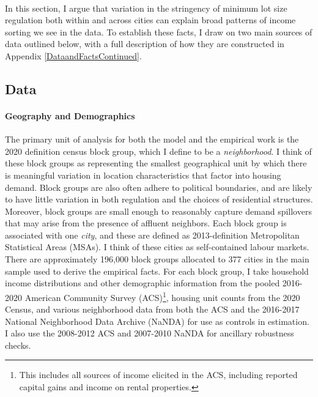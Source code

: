 \documentclass[12pt]{article}
\begin{document}
	\paragraph*{}
	In this section, I argue that variation in the stringency of minimum lot size regulation both within and across cities can explain broad patterns of income sorting we see in the data. To establish these facts, I draw on two main sources of data outlined below, with a full description of how they are constructed in Appendix \ref{DataandFactsContinued}.
	
	\subsection{Data}

	 \paragraph*{Geography and Demographics} The primary unit of analysis for both the model and the empirical work is the 2020 definition census block group, which I define to be a \textit{neighborhood}. I think of these block groups as representing the smallest geographical unit by which there is meaningful variation in location characteristics that factor into housing demand. Block groups are also often adhere to political boundaries, and are likely to have little variation in both regulation and the choices of residential structures. Moreover, block groups are small enough to reasonably capture demand spillovers that may arise from the presence of affluent neighbors. Each block group is associated with one \textit{city}, and these are defined as 2013-definition Metropolitan Statistical Areas (MSAs). I think of these cities as self-contained labour markets. There are approximately 196,000 block groups allocated to 377 cities in the main sample used to derive the empirical facts. For each block group, I take household income distributions and other demographic information from the pooled 2016-2020 American Community Survey (ACS)\footnote{This includes all sources of income elicited in the ACS, including reported capital gains and income on rental properties.},  housing unit counts from the 2020 Census, and various neighborhood data from both the ACS and the 2016-2017 National Neighborhood Data Archive (NaNDA) for use as controls in estimation. I also use the 2008-2012 ACS and 2007-2010 NaNDA for ancillary robustness checks.    
	 
\end{document}
